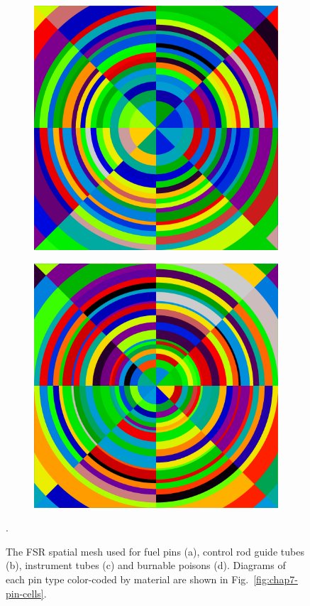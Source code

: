 \begin{figure}[h!]
\begin{subfigure}{.5\textwidth}
  \centering
  \includegraphics[width=0.8\linewidth]{figures/quantification/fsrs/fsrs-instr-tube}
  \caption{}
  \label{fig:chap8-instr-tube}
\end{subfigure}%
\begin{subfigure}{.5\textwidth}
  \centering
  \includegraphics[width=0.8\linewidth]{figures/quantification/fsrs/fsrs-bp}
  \caption{}
  \label{fig:chap8-bp}
\end{subfigure}%
\caption[FSR discretization meshes applied to BEAVRS pin cells]{The \ac{FSR} spatial mesh used for fuel pins (a), control rod guide tubes (b), instrument tubes (c) and burnable poisons (d). Diagrams of each pin type color-coded by material are shown in Fig.~\ref{fig:chap7-pin-cells}.}.
\label{fig:chap8-pin-cell-fsrs}
\end{figure}

